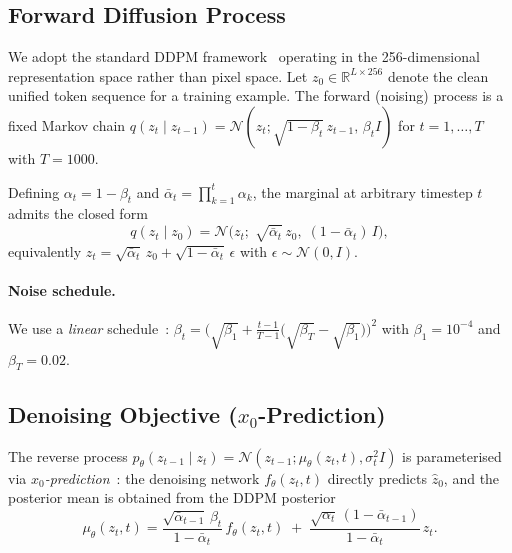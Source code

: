 \documentclass[12pt]{article}
\begin{document}
\subsection{Forward Diffusion Process}

We adopt the standard DDPM framework~\cite{ho2020ddpm,sohl2015deep}
operating in the 256-dimensional representation space
rather than pixel space.
Let $z_0 \in \mathbb{R}^{L \times 256}$ denote the clean unified
token sequence for a training example.
The forward (noising) process is a fixed Markov chain
$q(z_t \mid z_{t-1}) = \mathcal{N}(z_t; \sqrt{1-\beta_t}\, z_{t-1},\, \beta_t I)$
for $t = 1, \ldots, T$ with $T = 1000$.

Defining $\alpha_t = 1 - \beta_t$ and $\bar{\alpha}_t = \prod_{k=1}^{t} \alpha_k$,
the marginal at arbitrary timestep $t$ admits the closed form
\begin{equation}\label{eq:forward-marginal}
    q(z_t \mid z_0)
    = \mathcal{N}\!\bigl(z_t;\; \sqrt{\bar{\alpha}_t}\, z_0,\;
    (1 - \bar{\alpha}_t)\, I\bigr),
\end{equation}
equivalently
$z_t = \sqrt{\bar{\alpha}_t}\, z_0 + \sqrt{1-\bar{\alpha}_t}\, \epsilon$
with $\epsilon \sim \mathcal{N}(0, I)$.

\paragraph{Noise schedule.}
We use a \emph{linear} schedule~\cite{ho2020ddpm}:
$\beta_t = \bigl(\sqrt{\beta_1} + \frac{t-1}{T-1}\bigl(\sqrt{\beta_T} - \sqrt{\beta_1}\bigr)\bigr)^{\!2}$
with $\beta_1 = 10^{-4}$ and $\beta_T = 0.02$.

\subsection{Denoising Objective ($x_0$-Prediction)}
\label{sec:x0-pred}

The reverse process
$p_\theta(z_{t-1} \mid z_t) = \mathcal{N}(z_{t-1}; \mu_\theta(z_t, t), \sigma_t^2 I)$
is parameterised via \emph{$x_0$-prediction}~\cite{ramesh2022hierarchical}:
the denoising network $f_\theta(z_t, t)$ directly predicts $\hat{z}_0$,
and the posterior mean is obtained from the DDPM posterior
\begin{equation}\label{eq:posterior-mean}
    \mu_\theta(z_t, t)
    = \frac{\sqrt{\bar{\alpha}_{t-1}}\,\beta_t}{1 - \bar{\alpha}_t}\,
    f_\theta(z_t, t)
    \;+\;
    \frac{\sqrt{\alpha_t}\,(1 - \bar{\alpha}_{t-1})}{1 - \bar{\alpha}_t}\,
    z_t.
\end{equation}
\end{document}
